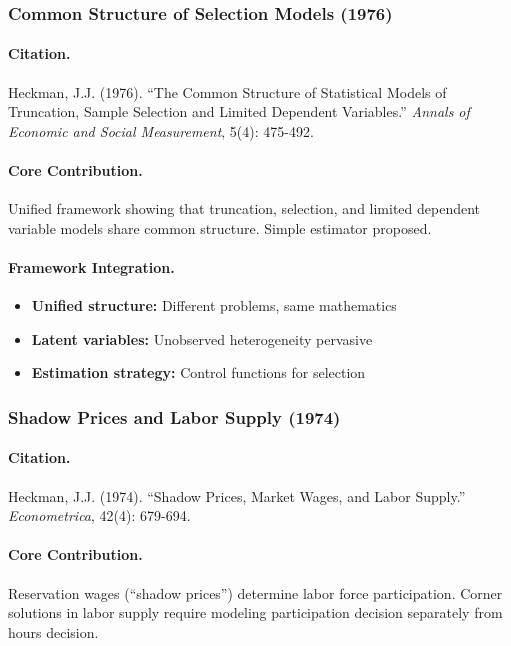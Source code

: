 \documentclass[12pt,a4paper]{article}
\begin{document}
\subsubsection{Common Structure of Selection Models (1976)}

\paragraph{Citation.}
Heckman, J.J. (1976). ``The Common Structure of Statistical Models of
Truncation, Sample Selection and Limited Dependent Variables.''
\emph{Annals of Economic and Social Measurement}, 5(4): 475-492.

\paragraph{Core Contribution.}
Unified framework showing that truncation, selection, and limited
dependent variable models share common structure. Simple estimator proposed.

\paragraph{Framework Integration.}
\begin{itemize}
  \item \textbf{Unified structure:} Different problems, same mathematics
  \item \textbf{Latent variables:} Unobserved heterogeneity pervasive
  \item \textbf{Estimation strategy:} Control functions for selection
\end{itemize}

\subsubsection{Shadow Prices and Labor Supply (1974)}

\paragraph{Citation.}
Heckman, J.J. (1974). ``Shadow Prices, Market Wages, and Labor Supply.''
\emph{Econometrica}, 42(4): 679-694.

\paragraph{Core Contribution.}
Reservation wages (``shadow prices'') determine labor force participation.
Corner solutions in labor supply require modeling participation decision
separately from hours decision.
\end{document}
